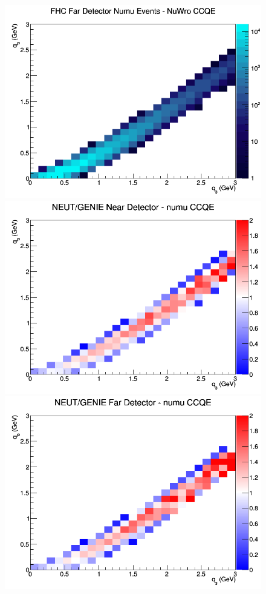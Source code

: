 \documentclass[12pt]{article}
\begin{document}
\begin{figure}[h]
\endminipage
{}
\includegraphics[width=\linewidth]{q0_q3/nominal/CCQE_FHC_FD_numu_q3_q0_NuWro.png}
\endminipage
\newline
{}
\includegraphics[width=\linewidth]{q0_q3/nominal/ratios/CCQE_NEUT_GENIE_numu_near_q3_q0.png}
\endminipage
{}
\includegraphics[width=\linewidth]{q0_q3/nominal/ratios/CCQE_NEUT_GENIE_numu_far_q3_q0.png}

\end{figure}
\end{document}
